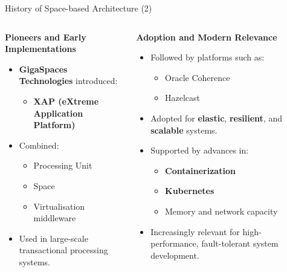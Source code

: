 \documentclass[aspectratio=169, table]{beamer}
\begin{document}
	\begin{frame}{History of Space-based Architecture (2)}
		\vspace{20pt}
		\begin{columns}[t]
			\begin{column}{0.45\textwidth}
				\textbf{Pioneers and Early Implementations}
				\begin{itemize}
					\item \textbf{GigaSpaces Technologies} introduced:
					\begin{itemize}
						\item \textbf{XAP (eXtreme Application Platform)}
					\end{itemize}
					\item Combined:
					\begin{itemize}
						\item Processing Unit
						\item Space
						\item Virtualisation middleware
					\end{itemize}
					\item Used in large-scale transactional processing systems.
				\end{itemize}
			\end{column}
			
			\begin{column}{0.55\textwidth}
				\textbf{Adoption and Modern Relevance}
				\begin{itemize}
					\item Followed by platforms such as:
					\begin{itemize}
						\item Oracle Coherence
						\item Hazelcast
					\end{itemize}
					\item Adopted for \textbf{elastic}, \textbf{resilient}, and \textbf{scalable} systems.
					\item Supported by advances in:
					\begin{itemize}
						\item \textbf{Containerization}
						\item \textbf{Kubernetes}
						\item Memory and network capacity
					\end{itemize}
					\item Increasingly relevant for high-performance, fault-tolerant system development.
				\end{itemize}
			\end{column}
		\end{columns}
	\end{frame}
	
\end{document}
